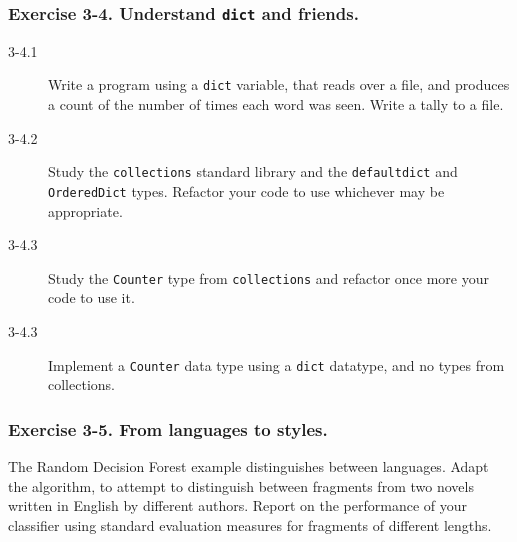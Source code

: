 \documentclass{beamer} %
\begin{document}
\begin{frame}

\frametitle{Exercise 3-4. Understand \texttt{dict} and friends.}

\begin{description}
  \item[3-4.1] Write a program using a \texttt{dict} variable, that reads over a file, and produces a count of the number of times each word was seen. Write a tally to a file.
  \item[3-4.2] Study the \texttt{collections} standard library and the \texttt{defaultdict} and \texttt{OrderedDict} types. Refactor your code to use whichever may be appropriate.
  \item[3-4.3] Study the \texttt{Counter} type from \texttt{collections} and refactor once more your code to use it. 
  \item[3-4.3] Implement a \texttt{Counter} data type using a \texttt{dict} datatype, and no types from collections.
\end{description}

\end{frame}

\begin{frame}

\frametitle{Exercise 3-5. From languages to styles.}

The Random Decision Forest example distinguishes between languages. Adapt the algorithm, to attempt to distinguish between fragments from two novels written in English by different authors. Report on the performance of your classifier using standard evaluation measures for fragments of different lengths.

\end{frame}




\end{document}
